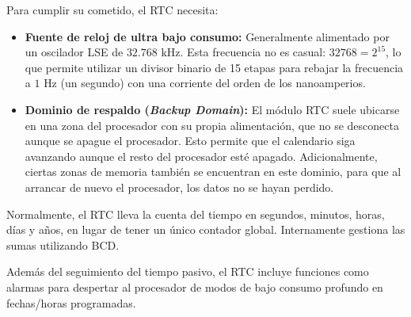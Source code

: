 \documentclass[../main.tex]{subfiles}
\begin{document}
        Para cumplir su cometido, el RTC necesita:

        \begin{itemize}
            \item \textbf{Fuente de reloj de ultra bajo consumo:} Generalmente alimentado por un oscilador LSE de $32.768\text{ kHz}$. Esta frecuencia no es casual: $32768 = 2^{15}$, lo que permite utilizar un divisor binario de 15 etapas para rebajar la frecuencia a $1\text{ Hz}$ (un segundo) con una corriente del orden de los nanoamperios.
            \item \textbf{Dominio de respaldo (\emph{Backup Domain}):} El módulo RTC suele ubicarse en una zona del procesador con su propia alimentación, que no se desconecta aunque se apague el procesador. Esto permite que el calendario siga avanzando aunque el resto del procesador esté apagado. Adicionalmente, ciertas zonas de memoria también se encuentran en este dominio, para que al arrancar de nuevo el procesador, los datos no se hayan perdido.
        \end{itemize}

        Normalmente, el RTC lleva la cuenta del tiempo en segundos, minutos, horas, días y años, en lugar de tener un único contador global. Internamente gestiona las sumas utilizando BCD.

        Además del seguimiento del tiempo pasivo, el RTC incluye funciones como alarmas para despertar al procesador de modos de bajo consumo profundo en fechas/horas programadas.
\end{document}
